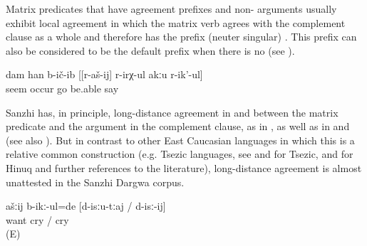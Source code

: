 Matrix predicates that have agreement prefixes and non- arguments usually exhibit local agreement in which the matrix verb agrees with the complement clause as a whole and therefore has the prefix  (neuter singular) . This prefix can also be considered to be the default prefix when there is no  (see ).
%
\begin{exe}
	\ex	\label{ex:‎I thought that she cannot walk}
	\gll	dam	han	b-ič-ib	[[r-aš-ij]	r-irχ-ul	akːu	r-ik'-ul]\\
			seem	occur	\tsc{f-}go be.able		say\\
	\glt	{}
\end{exe}

Sanzhi has, in principle, long-distance agreement in  and  between the matrix predicate and the  argument in the complement clause, as in , as well as in  and  (see also ). But in contrast to other East Caucasian languages in which this is a relative common construction (e.g. Tsezic languages, see \citealp{Polinsky.Potsdam2001} and \citealp{Polinsky2003} for Tsezic, and \citealp[628]{Forker2013a} for Hinuq and further references to the literature), long-distance agreement is almost unattested in the Sanzhi Dargwa corpus. 
%
\begin{exe}
	\ex	\label{ex:You wanted to cry1}
	\gll	ašːij	b-ikː-ul=de	[d-isːu-tːaj	/	d-isː-ij]\\
			want	cry	/	cry\\
	\glt	{} (E)
\end{exe}

